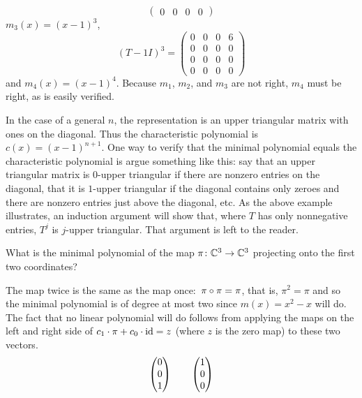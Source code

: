 \begin{exercises}
\begin{answer}
\begin{equation*}
\begin{pmatrix}
          0  &0  &0  &0
        \end{pmatrix}
      \end{equation*}
      $m_3(x)=(x-1)^3$,
      \begin{equation*}
        (T-1I)^3=
        \begin{pmatrix}
          0  &0  &0  &6  \\
          0  &0  &0  &0  \\
          0  &0  &0  &0  \\
          0  &0  &0  &0
        \end{pmatrix}
      \end{equation*}
      and $m_4(x)=(x-1)^4$.
      Because $m_1$, $m_2$, and $m_3$ are not right, $m_4$ must be right,
      as is easily verified.
      
      In the case of a general $n$, the representation is an upper
      triangular matrix with ones on the diagonal.
      Thus the characteristic polynomial is $c(x)=(x-1)^{n+1}$.
      One way to verify that the minimal polynomial equals the 
      characteristic polynomial is argue something like this:
      say that an upper triangular matrix is $0$-upper triangular if
      there are nonzero entries on the diagonal, that it is $1$-upper 
      triangular if the diagonal contains only zeroes and there are nonzero
      entries just above the diagonal, etc.
      As the above example illustrates, an induction argument will 
      show that, where $T$ has only nonnegative entries, 
      $T^j$ is $j$-upper triangular.
      That argument is left to the reader.
    \end{answer}
   \item 
     What is the minimal polynomial of
     the map \( \mbox{$\pi\colon \mathbb{C}^3\to \mathbb{C}^3$} \)
     projecting onto the first two coordinates?
      \begin{answer}
        The map twice is the same as the map once:~$\pi\mathbin\circ \pi=\pi$,
        that is, $\pi^2=\pi$ and so the minimal polynomial is of degree
        at most two since \( m(x)=x^2-x \) will do.
        The fact that no linear polynomial will do follows from applying
        the maps on the left and right side of 
        $c_1\cdot \pi+c_0\cdot \mbox{id}=z$ (where $z$ is the zero map)
        to these two vectors.
        \begin{equation*}
          \colvec{0 \\ 0 \\ 1}
          \qquad
          \colvec{1 \\ 0 \\ 0}

\end{equation*}
\end{answer}
\end{exercises}
